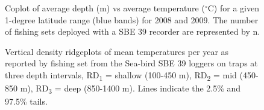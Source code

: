 \documentclass[12pt]{article}\usepackage[]{graphicx}\usepackage[]{color}
\begin{document}
\begin{figure}[htb]

{\centering {} 

}

\caption{Coplot of average depth (m) vs average temperature (\(^\circ\)C) for a given 1-degree latitude range (blue bands) for 2008 and 2009. The number of fishing sets deployed with a SBE 39 recorder are represented by n.}\label{fig:figure18}
\end{figure}
\clearpage


\begin{figure}[htb]

{\centering {} 

}

\caption{Vertical density ridgeplots of mean temperatures per year as reported by fishing set from the Sea-bird SBE 39 loggers on traps at three depth intervals, RD\textsubscript{1} = shallow (100-450 m), RD\textsubscript{2} = mid (450-850 m), RD\textsubscript{3} = deep (850-1400 m). Lines indicate the 2.5\% and 97.5\% tails.}\label{fig:figure19}
\end{figure}
\end{document}
